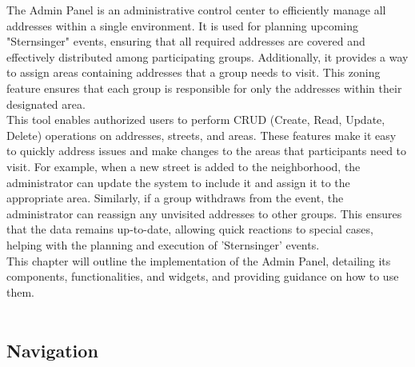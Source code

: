 \Author{\daAuthorOne}

The Admin Panel is an administrative control center to efficiently manage all addresses within a single environment. It is used for planning upcoming "Sternsinger" events, ensuring that all required addresses are covered and effectively distributed among participating groups. Additionally, it provides a way to assign areas containing addresses that a group needs to visit. This zoning feature ensures that each group is responsible for only the addresses within their designated area.\\

This tool enables authorized users to perform CRUD (Create, Read, Update, Delete) operations on addresses, streets, and areas. These features make it easy to quickly address issues and make changes to the areas that participants need to visit. For example, when a new street is added to the neighborhood, the administrator can update the system to include it and assign it to the appropriate area. Similarly, if a group withdraws from the event, the administrator can reassign any unvisited addresses to other groups. This ensures that the data remains up-to-date, allowing quick reactions to special cases, helping with the planning and execution of 'Sternsinger' events.\\

This chapter will outline the implementation of the Admin Panel, detailing its components, functionalities, and widgets, and providing guidance on how to use them.\\\\


\subsection{Navigation}

